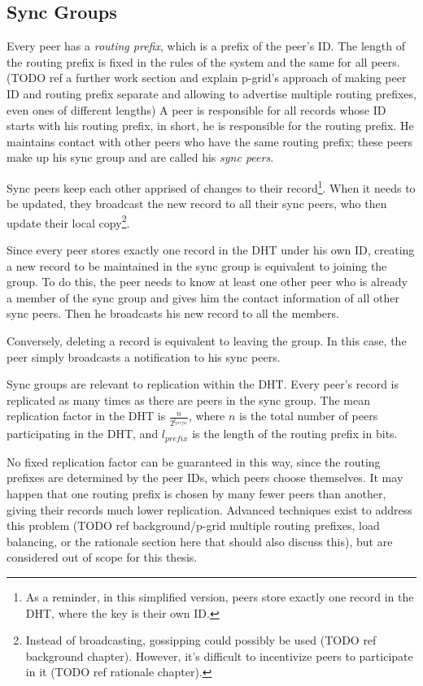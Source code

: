 \subsection{Sync Groups}
\label{sec:desc_sync_groups}
Every peer has a \emph{routing prefix}, which is a prefix of the peer's ID. The
length of the routing prefix is fixed in the rules of the system and the same
for all peers. (TODO ref a further work section and explain p-grid's approach of
making peer ID and routing prefix separate and allowing to advertise multiple
routing prefixes, even ones of different lengths) A peer is responsible for all
records whose ID starts with his routing prefix, in short, he is responsible for
the routing prefix. He maintains contact with other peers who have the same
routing prefix; these peers make up his sync group and are called his \emph{sync
peers}.

Sync peers keep each other apprised of changes to their record\footnote{As a
reminder, in this simplified version, peers store exactly one record in the
\ac{DHT}, where the key is their own ID.}. When it needs to be updated, they
broadcast the new record to all their sync peers, who then update their local
copy\footnote{Instead of broadcasting, gossipping could possibly be used (TODO
ref background chapter). However, it's difficult to incentivize peers to
participate in it (TODO ref rationale chapter).}.

Since every peer stores exactly one record in the \ac{DHT} under his own ID,
creating a new record to be maintained in the sync group is equivalent to
joining the group. To do this, the peer needs to know at least one other peer
who is already a member of the sync group and gives him the contact information
of all other sync peers. Then he broadcasts his new record to all the members.

Conversely, deleting a record is equivalent to leaving the group. In this case,
the peer simply broadcasts a notification to his sync peers.

Sync groups are relevant to replication within the \ac{DHT}. Every peer's record
is replicated as many times as there are peers in the sync group. The mean
replication factor in the \ac{DHT} is $\frac{n}{2^{l_{prefix}}}$, where $n$ is
the total number of peers participating in the \ac{DHT}, and $l_{prefix}$ is the
length of the routing prefix in bits.

No fixed replication factor can be guaranteed in this way, since the routing
prefixes are determined by the peer IDs, which peers choose themselves. It may
happen that one routing prefix is chosen by many fewer peers than another,
giving their records much lower replication. Advanced techniques exist to
address this problem (TODO ref background/p-grid multiple routing prefixes, load
balancing, or the rationale section here that should also discuss this), but are
considered out of scope for this thesis.

